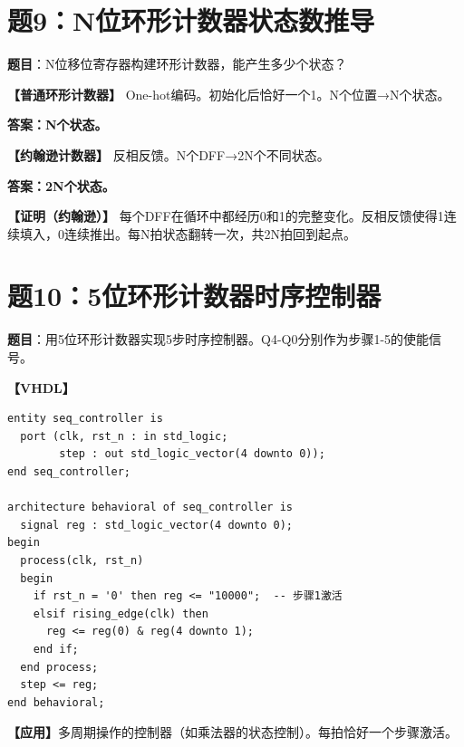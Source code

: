 \section{题9：N位环形计数器状态数推导}

\textbf{题目}：N位移位寄存器构建环形计数器，能产生多少个状态？

\begin{solution}[完整解答]

\textbf{【普通环形计数器】}
One-hot编码。初始化后恰好一个1。N个位置→N个状态。

\textbf{答案：N个状态。}

\textbf{【约翰逊计数器】}
反相反馈。N个DFF→2N个不同状态。

\textbf{答案：2N个状态。}

\textbf{【证明（约翰逊）】}
每个DFF在循环中都经历0和1的完整变化。反相反馈使得1连续填入，0连续推出。每N拍状态翻转一次，共2N拍回到起点。

\end{solution}


\section{题10：5位环形计数器时序控制器}

\textbf{题目}：用5位环形计数器实现5步时序控制器。Q4-Q0分别作为步骤1-5的使能信号。

\begin{solution}[完整解答]

\textbf{【VHDL】}
\begin{lstlisting}
entity seq_controller is
  port (clk, rst_n : in std_logic;
        step : out std_logic_vector(4 downto 0));
end seq_controller;

architecture behavioral of seq_controller is
  signal reg : std_logic_vector(4 downto 0);
begin
  process(clk, rst_n)
  begin
    if rst_n = '0' then reg <= "10000";  -- 步骤1激活
    elsif rising_edge(clk) then
      reg <= reg(0) & reg(4 downto 1);
    end if;
  end process;
  step <= reg;
end behavioral;
\end{lstlisting}

\textbf{【应用】}多周期操作的控制器（如乘法器的状态控制）。每拍恰好一个步骤激活。

\end{solution}


